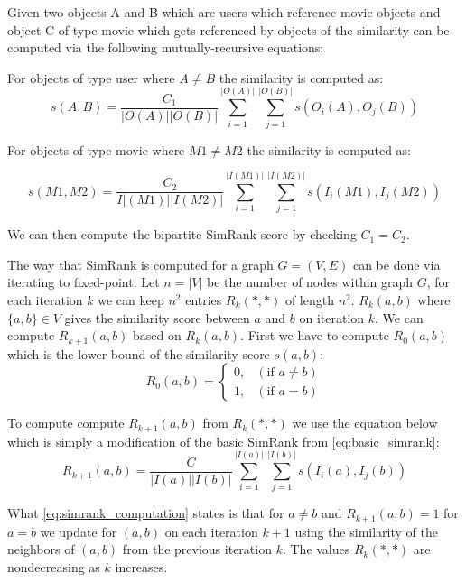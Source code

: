 \begin{definition}\label{def:bipartite_simrank} Given two objects A and B which are users which reference movie objects and object C of type movie which gets referenced by objects of the similarity can be computed via the following mutually-recursive equations:

	For objects of type user where $A \neq B$ the similarity is computed as:
	\begin{equation}\label{eq:bipartite_simrank1}
	s(A,B)= \frac{C_1}{|O(A)||O(B)|}\sum^{|O(A)|}_{i=1}\sum^{|O(B)|}_{j=1}s(O_i(A),O_j(B))
	\end{equation}

	For objects of type movie where $M1 \neq M2$ the similarity is computed as:

	\begin{equation}\label{eq:bipartite_simrank2}
	s(M1, M2)= \frac{C_2}{I|(M1)||I(M2)|}\sum^{|I(M1)|}_{i=1}\sum^{|I(M2)|}_{j=1}s(I_i(M1),I_j(M2))
	\end{equation}

	We can then compute the bipartite SimRank score by checking $C_1 = C_2$\cite{10.1145/775047.775126}.
\end{definition}

The way that SimRank is computed for a graph $G = (V,E)$ can be done via iterating to fixed-point. Let $n = |V|$ be the number of nodes within graph $G$, for each iteration $k$ we can keep $n^2$ entries $R_k(*,*)$ of length $n^2$. $R_k(a,b)$ where $\{a,b\} \in V$ gives the similarity score between $a$ and $b$ on iteration $k$\cite{10.1145/775047.775126}. We can compute $R_{k+1}(a,b)$ based on $R_k(a,b)$. First we have to compute $R_0(a,b)$ which is the lower bound of the similarity score $s(a,b)$:
\begin{equation}\label{eq:lowerbound_sim_score}
R_0(a,b)= \begin{cases}
0, & (\text{if } a \neq b) \\

1 ,& (\text{if } a = b)
\end{cases}
\end{equation}

To compute compute $R_{k+1}(a,b)$ from $R_k(*,*)$ we use the equation below which is simply a modification of the basic SimRank from \autoref{eq:basic_simrank}:
\begin{equation}\label{eq:simrank_computation}
R_{k+1}(a,b)= \frac{C}{|I(a)||I(b)|}\sum^{|I(a)|}_{i=1}\sum^{|I(b)|}_{j=1}s(I_i(a),I_j(b))
\end{equation}

What \autoref{eq:simrank_computation} states is that for $a \neq b$ and $R_{k+1}(a,b) = 1$ for $a = b$ we update for $(a,b)$ on each iteration $k+1$ using the similarity of the neighbors of $(a,b)$ from the previous iteration $k$. The values $R_k(*,*)$ are nondecreasing as $k$ increases.
